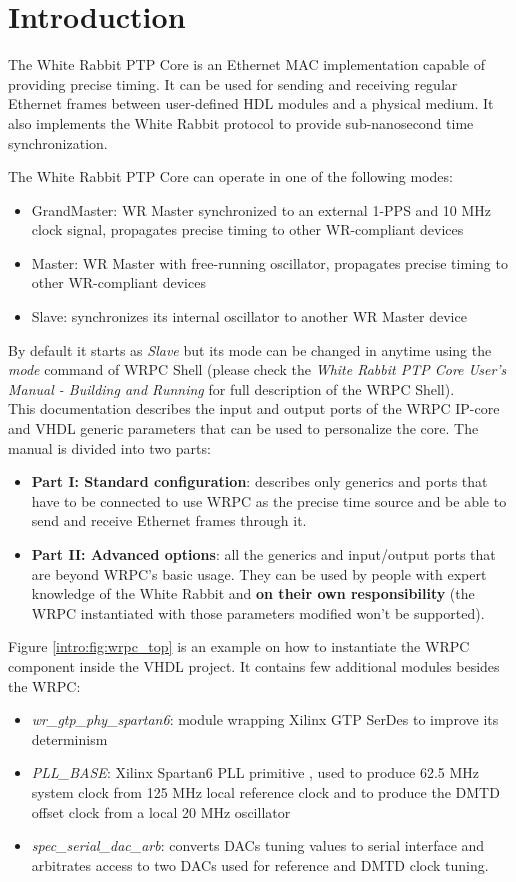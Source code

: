 \section{Introduction}
The White Rabbit PTP Core is an Ethernet MAC implementation capable of providing
precise timing. It can be used for sending and receiving regular Ethernet
frames between user-defined HDL modules and a physical medium. It also
implements the White Rabbit protocol to provide sub-nanosecond time
synchronization.

The White Rabbit PTP Core can operate in one of the following modes:
\begin{itemize}
  \item GrandMaster: WR Master synchronized to an external 1-PPS and 10 MHz clock
    signal, propagates precise timing to other WR-compliant devices
  \item Master: WR Master with free-running oscillator, propagates precise
    timing to other WR-compliant devices
  \item Slave: synchronizes its internal oscillator to another WR Master device
\end{itemize}
By default it starts as \emph{Slave} but its mode can be changed in anytime
using the \emph{mode} command of WRPC Shell (please check the \emph{White
Rabbit PTP Core User's Manual - Building and Running} \cite{wrpc_man}  for full
description of the WRPC Shell).\\


This documentation describes the input and output ports of the WRPC IP-core and
VHDL generic parameters that can be used to personalize the core. The manual is
divided into two parts:
\begin{itemize}
  \item {\bf Part I: Standard configuration}: describes only generics and ports
    that have to be connected to use WRPC as the precise time source and be able
    to send and receive Ethernet frames through it.
  \item {\bf Part II: Advanced options}: all the generics and input/output ports
    that are beyond WRPC's basic usage. They can be used by people with expert
    knowledge of the White Rabbit and {\bf on their own responsibility} (the WRPC
    instantiated with those parameters modified won't be supported).
\end{itemize}

Figure \ref{intro:fig:wrpc_top} is an example on how to instantiate the WRPC
component inside the VHDL project. It contains few additional modules besides
the WRPC:
\begin{itemize}
  \item \emph{wr\_gtp\_phy\_spartan6}: module wrapping Xilinx GTP SerDes to
    improve its determinism
  \item \emph{PLL\_BASE}: Xilinx Spartan6 PLL primitive \cite{pll_base}, used to
    produce 62.5 MHz system clock from 125 MHz local reference clock and to
    produce the DMTD offset clock from a local 20 MHz oscillator
  \item \emph{spec\_serial\_dac\_arb}: converts DACs tuning values to serial
    interface and arbitrates access to two DACs used for reference and DMTD
    clock tuning.
\end{itemize}

